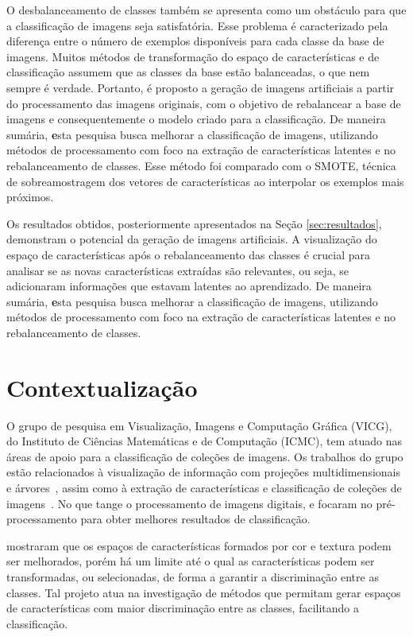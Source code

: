 O desbalanceamento de classes também se apresenta como um obstáculo para que a classificação de imagens seja satisfatória. Esse problema é caracterizado pela diferença entre o número de exemplos disponíveis para cada classe da base de imagens. Muitos métodos de transformação do espaço de características e de classificação assumem que as classes da base estão balanceadas, o que nem sempre é verdade. Portanto, é proposto a geração de imagens artificiais a partir do processamento das imagens originais, com o objetivo de rebalancear a base de imagens e consequentemente o modelo criado para a classificação. De maneira sumária, {\textbf esta pesquisa busca melhorar a classificação de imagens, utilizando métodos de processamento com foco na extração de características latentes e no rebalanceamento de classes.} Esse método foi comparado com o SMOTE, técnica de sobreamostragem dos vetores de características ao interpolar os exemplos mais próximos.

Os resultados obtidos, posteriormente apresentados na Seção \ref{sec:resultados}, demonstram o potencial da geração de imagens artificiais. A visualização do espaço de características após o rebalanceamento das classes é crucial para analisar se as novas características extraídas são relevantes, ou seja, se adicionaram informações que estavam latentes ao aprendizado. De maneira sumária, {\textbf esta pesquisa busca melhorar a classificação de imagens, utilizando métodos de processamento com foco na extração de características latentes e no rebalanceamento de classes.}

\section{Contextualização}

O grupo de pesquisa em Visualização, Imagens e Computação Gráfica (VICG), do Instituto de Ciências Matemáticas e de Computação (ICMC), tem atuado nas áreas de apoio para a classificação de coleções de imagens. Os trabalhos do grupo estão relacionados à visualização de informação com projeções multidimensionais e árvores~\cite{Joia2011}, assim como à extração de características e classificação de coleções de imagens~\cite{Paiva2011}. No que tange o processamento de imagens digitais,  e  focaram no pré-processamento para obter melhores resultados de classificação.

 mostraram que os espaços de características formados por cor e textura podem ser melhorados, porém há um limite até o qual as características podem ser transformadas, ou selecionadas, de forma a garantir a discriminação entre as classes. Tal projeto atua na investigação de métodos que permitam gerar espaços de características com maior discriminação entre as classes, facilitando a classificação.

